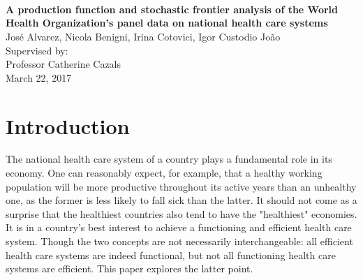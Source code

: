 \documentclass[12pt,a4paper]{article}\usepackage[]{graphicx}\usepackage[]{color}
\begin{document}



\vspace{1cm}
\begin{center}
 \\
\vspace{2cm}
 \\
\vspace{1cm}
 \\  %
\vspace{1cm}
\textbf{\Large{A production function and stochastic frontier analysis of the World Health Organization's panel data on national health care systems}} \\
\vspace{1cm}
Jos\'{e} Alvarez, Nicola Benigni, Irina Cotovici, Igor Custodio Jo\~{a}o \\
\vspace{1cm}
Supervised by: \\
Professor Catherine Cazals \\
\vspace{1cm}
March 22, 2017
\end{center}

\vfill


\newpage 
{}
\tableofcontents

\newpage
\section{Introduction}

The national health care system of a country plays a fundamental role in its economy. One can reasonably expect, for example, that a healthy working population will be more productive throughout its active years than an unhealthy one, as the former is less likely to fall sick than the latter. It should not come as a surprise that the healthiest countries also tend to have the "healthiest" economies. It is in a country's best interest to achieve a functioning and efficient health care system. Though the two concepts are not necessarily interchangeable: all efficient health care systems are indeed functional, but not all functioning health care systems are efficient. This paper explores the latter point.
\end{document}

